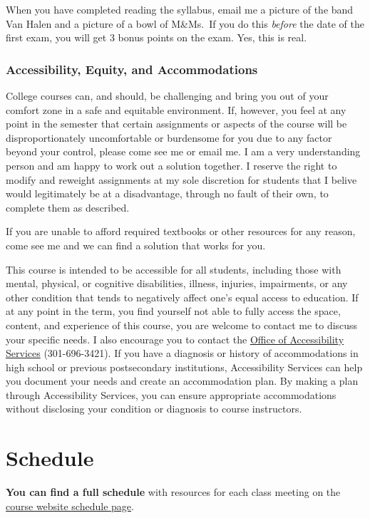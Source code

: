 \documentclass{article}
\begin{document}
When you have completed reading the syllabus, email me a picture of the
band Van Halen and a picture of a bowl of M\&Ms.~If you do this
\emph{before} the date of the first exam, you will get 3 bonus points on
the exam. Yes, this is real.

\hypertarget{accessibility-equity-and-accommodations}{%
\subsubsection{Accessibility, Equity, and
Accommodations}\label{accessibility-equity-and-accommodations}}

College courses can, and should, be challenging and bring you out of
your comfort zone in a safe and equitable environment. If, however, you
feel at any point in the semester that certain assignments or aspects of
the course will be disproportionately uncomfortable or burdensome for
you due to any factor beyond your control, please come see me or email
me. I am a very understanding person and am happy to work out a solution
together. I reserve the right to modify and reweight assignments at my
sole discretion for students that I belive would legitimately be at a
disadvantage, through no fault of their own, to complete them as
described.

If you are unable to afford required textbooks or other resources for
any reason, come see me and we can find a solution that works for you.

This course is intended to be accessible for all students, including
those with mental, physical, or cognitive disabilities, illness,
injuries, impairments, or any other condition that tends to negatively
affect one's equal access to education. If at any point in the term, you
find yourself not able to fully access the space, content, and
experience of this course, you are welcome to contact me to discuss your
specific needs. I also encourage you to contact the
\href{https://www.hood.edu/academics/josephine-steiner-center-academic-achievement-retention/accessibility-services}{Office
of Accessibility Services} (301-696-3421). If you have a diagnosis or
history of accommodations in high school or previous postsecondary
institutions, Accessibility Services can help you document your needs
and create an accommodation plan. By making a plan through Accessibility
Services, you can ensure appropriate accommodations without disclosing
your condition or diagnosis to course instructors.

\hypertarget{schedule}{%
\section{Schedule}\label{schedule}}

\textbf{You can find a full schedule} with resources for each class
meeting on the
\href{http://microF19.classes.ryansafner.com/schedule/}{course website
schedule page}.
\end{document}
